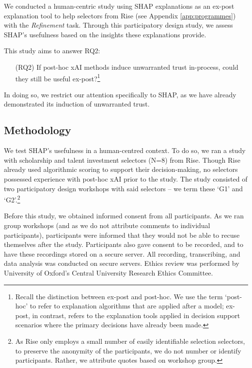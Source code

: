 We conducted a human-centric study using SHAP explanations as an ex-post explanation tool to help selectors from Rise (see Appendix \ref{app:programmes}) with the \emph{Refinement} task. Through this participatory design study, we assess SHAP's usefulness based on the insights these explanations provide.

This study aims to answer RQ2:

\begin{enumerate}
    \item[(RQ2)] If post-hoc xAI methods induce unwarranted trust in-process, could they still be useful ex-post?\footnote{Recall the distinction between ex-post and post-hoc. We use the term `post-hoc' to refer to explanation algorithms that are applied after a model; ex-post, in contrast, refers to the explanation tools applied in decision support scenarios where the primary decisions have already been made.}
\end{enumerate}

\noindent In doing so, we restrict our attention specifically to SHAP, as we have already demonstrated its induction of unwarranted trust.

\subsection{Methodology}\label{ssec:cs_methods}
We test SHAP's usefulness in a human-centred context. To do so, we ran a study with scholarship and talent investment selectors (N=8) from Rise. Though Rise already used algorithmic scoring to support their decision-making, no selectors possessed experience with post-hoc xAI prior to the study. The study consisted of two participatory design workshops with said selectors – we term these `G1' and `G2'.\footnote{As Rise only employs a small number of easily identifiable selection selectors, to preserve the anonymity of the participants, we do not number or identify participants. Rather, we attribute quotes based on workshop group.}

Before this study, we obtained informed consent from all participants. As we ran group workshops (and as we do not attribute comments to individual participants), participants were informed that they would not be able to recuse themselves after the study. Participants also gave consent to be recorded, and to have these recordings stored on a secure server. All recording, transcribing, and data analysis was conducted on secure servers. Ethics review was performed by University of Oxford's Central University Research Ethics Committee.

